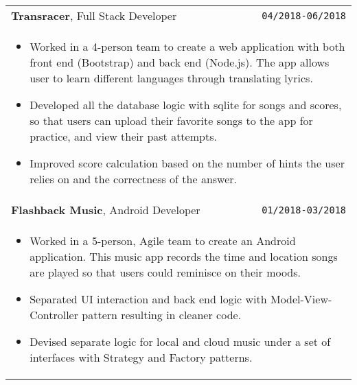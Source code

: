 \documentclass[10pt, letterpaper]{article}
\newcommand{\itemcols}[1]{
	\multicolumn{2}{p{\dimexpr \linewidth-2\tabcolsep}}{
	\begin{itemize}
		#1
	\end{itemize}
	}
}
\begin{document}
\begin{tabularx}{\linewidth}{X r}
	\textbf{\large Transracer}, Full Stack Developer & \texttt{04/2018-06/2018} \\
	\itemcols{
		\item Worked in a 4-person team to create a web application with both front end (Bootstrap) and back end (Node.js). The app allows user to learn different languages through translating lyrics.
		\item Developed all the database logic with sqlite for songs and scores, so that users can upload their favorite songs to the app for practice, and view their past attempts.
		\item Improved score calculation based on the number of hints the user relies on and the correctness of the answer.
	} \\
	

	
	\textbf{\large Flashback Music}, Android Developer & \texttt{01/2018-03/2018} \\
	\itemcols{
		\item Worked in a 5-person, Agile team to create an Android application. This music app records the time and location songs are played so that users could reminisce on their moods.
		\item Separated UI interaction and back end logic with Model-View-Controller pattern resulting in cleaner code.
		\item Devised separate logic for local and cloud music under a set of interfaces with Strategy and Factory patterns.
	}
\end{tabularx}

	\begin{comment}
\textbf{\large WayAround}, Front End Developer & \texttt{01/2018-03/2018} \\
\itemcols{
\item Worked in a 4-person team to create a web application mockup. The app allows users to customize their routes so as to enjoy the trip to the destination.
\item After paper prototypes, implemented the home page with Bootstrap, jQuery and Handlebars.js, where the users would customize the route. Wrote two versions of the page for A/B testing, analyzing the time each user used in navigating through the page to find out how users would approach a new product and modified to make the page user-friendly.
\item Perfected the review page, where the user rates the route based on their customization back on the home page.	
} \\
\end{comment}
\end{document}
